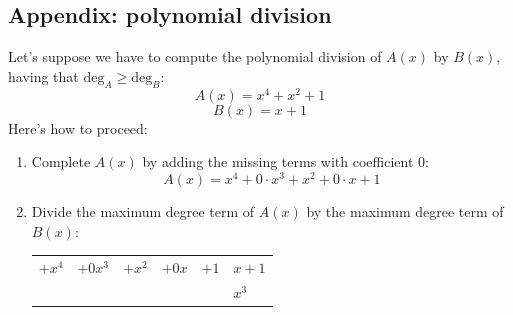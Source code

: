 \documentclass[11pt, a4paper]{article}
\begin{document}
\hypertarget{polDiv}{\subsection{Appendix: polynomial division}}
Let's suppose we have to compute the polynomial division of $A(x)$ by $B(x)$, having that $\text{deg}_A\ge\text{deg}_B$:
$$A(x)=x^4+x^2+1$$
$$B(x)=x+1$$
Here's how to proceed:
\begin{enumerate}
    \item Complete $A(x)$ by adding the missing terms with coefficient 0:
    $$A(x)=x^4+0\cdot x^3+x^2+0\cdot x+1$$
    \item Divide the maximum degree term of $A(x)$ by the maximum degree term of $B(x)$:
    \begin{center}
        \begin{tabular}{ccccc|l}
             $+x^4$ & $+0 x^3$ & $+x^2$ & $+0 x$ & $+1$ & $x+1$ \\
             \cline{6-6}
                    &          &        &        &      & $x^3$
             

\end{tabular}
\end{center}
\end{enumerate}
\end{document}
